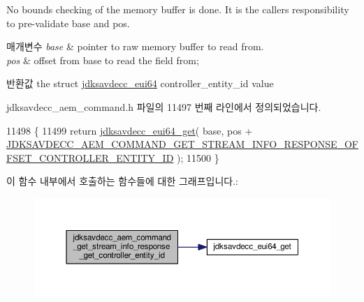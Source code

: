 No bounds checking of the memory buffer is done. It is the caller\textquotesingle{}s responsibility to pre-\/validate base and pos.


\begin{DoxyParams}{매개변수}
{\em base} & pointer to raw memory buffer to read from. \\
\hline
{\em pos} & offset from base to read the field from; \\
\hline
\end{DoxyParams}
\begin{DoxyReturn}{반환값}
the struct \hyperlink{structjdksavdecc__eui64}{jdksavdecc\+\_\+eui64} controller\+\_\+entity\+\_\+id value 
\end{DoxyReturn}


jdksavdecc\+\_\+aem\+\_\+command.\+h 파일의 11497 번째 라인에서 정의되었습니다.


\begin{DoxyCode}
11498 \{
11499     \textcolor{keywordflow}{return} \hyperlink{group__eui64_ga2652311a25a6b91cddbed75c108c7031}{jdksavdecc\_eui64\_get}( base, pos + 
      \hyperlink{group__command__get__stream__info__response_ga22e81bf702362b882d0ca89a48cae90c}{JDKSAVDECC\_AEM\_COMMAND\_GET\_STREAM\_INFO\_RESPONSE\_OFFSET\_CONTROLLER\_ENTITY\_ID}
       );
11500 \}
\end{DoxyCode}


이 함수 내부에서 호출하는 함수들에 대한 그래프입니다.\+:
\nopagebreak
\begin{figure}[H]
\begin{center}
\leavevmode
\includegraphics[width=350pt]{group__command__get__stream__info__response_gafd86abf80736f08b46b78bd646b3d07b_cgraph}
\end{center}
\end{figure}


